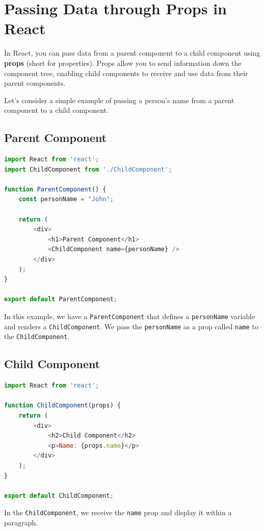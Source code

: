 \documentclass[11pt]{article}
\begin{document}
\section{Passing Data through Props in React}

In React, you can pass data from a parent component to a child component using \textbf{props} (short for properties). Props allow you to send information down the component tree, enabling child components to receive and use data from their parent components.

Let's consider a simple example of passing a person's name from a parent component to a child component.

\subsection{Parent Component}

\begin{lstlisting}[language=JavaScript, caption={ParentComponent.js}]
import React from 'react';
import ChildComponent from './ChildComponent';

function ParentComponent() {
    const personName = "John";

    return (
        <div>
            <h1>Parent Component</h1>
            <ChildComponent name={personName} />
        </div>
    );
}

export default ParentComponent;
\end{lstlisting}

In this example, we have a \texttt{ParentComponent} that defines a \texttt{personName} variable and renders a \texttt{ChildComponent}. We pass the \texttt{personName} as a prop called \texttt{name} to the \texttt{ChildComponent}.

\subsection{Child Component}

\begin{lstlisting}[language=JavaScript, caption={ChildComponent.js}]
import React from 'react';

function ChildComponent(props) {
    return (
        <div>
            <h2>Child Component</h2>
            <p>Name: {props.name}</p>
        </div>
    );
}

export default ChildComponent;
\end{lstlisting}

In the \texttt{ChildComponent}, we receive the \texttt{name} prop and display it within a paragraph.
\end{document}
